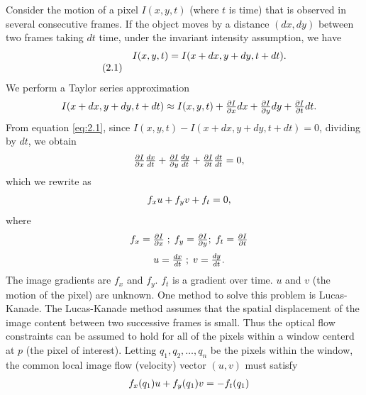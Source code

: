 Consider the motion of a pixel $I(x,y,t)$ (where $t$ is time) that is observed in several consecutive frames. If the object moves by a distance $(dx,dy)$ between two frames taking $dt$ time, under the invariant intensity assumption, we have
\[
\begin{array}{lc}
  {\rm } & {I(x,y,t)} = I(x+dx,y+dy,t+dt). \\ \tag{2.1} \label{eq:2.1}
\end{array}
\]
We perform a Taylor series approximation
\[
\begin{array}{lc}
  {\rm } & {I(x+dx,y+dy,t+dt) \approx I(x,y,t) + \frac{\partial I}{\partial x}dx+\frac{\partial I}{\partial y}d y+\frac{\partial I}{\partial t}dt}.\\ 
\end{array}
\]
From equation \eqref{eq:2.1}, since ${I(x,y,t)} - I(x+dx,y+dy,t+dt) = 0$, dividing by $dt$, we obtain
\[
\begin{array}{lc}
  {\rm } & {\frac{\partial I}{\partial x}\frac{dx}{dt}+\frac{\partial I}{\partial y}\frac{d y}{d t}+\frac{\partial I}{\partial t}\frac{dt}{dt} = 0},\\ 
\end{array}
\]
which we rewrite as
\[
\begin{array}{lc}
  {\rm } & {f_xu + f_yv+ f_t }= 0, \\ 
\end{array}
\]
where
\[
\begin{array}{lc}
  {\rm } & {f_x = \frac{\partial I}{\partial x} \; ; \; f_y = \frac{\partial I}{\partial y} ; \; f_t = \frac{\partial I}{\partial t}}\\ 
\end{array}
\]
\[
\begin{array}{lc}
  {\rm } & {u = \frac{dx}{dt} \; ; \; v = \frac{dy}{dt}.}\\ 
\end{array}
\]
The image gradients are $ f_x $ and $ f_y $. $ f_t $ is a gradient over time. $u$ and $v$ (the motion of the pixel) are unknown. One method to solve this problem is Lucas-Kanade. The Lucas-Kanade method assumes that the spatial displacement of the image content between two successive frames is small. Thus the optical flow constraints can be assumed to hold for all of the pixels within a window centerd at $p$ (the pixel of interest). Letting $q_1, q_2, \hdots ,q_n$ be the pixels within the window, the common local image flow (velocity) vector $(u,v)$ must satisfy
 \[
 \begin{array}{lc}
 {\rm } & {f_x(q_1)u + f_y(q_1)v} = - f_t(q_1) \\ 
 \end{array}
 \]
